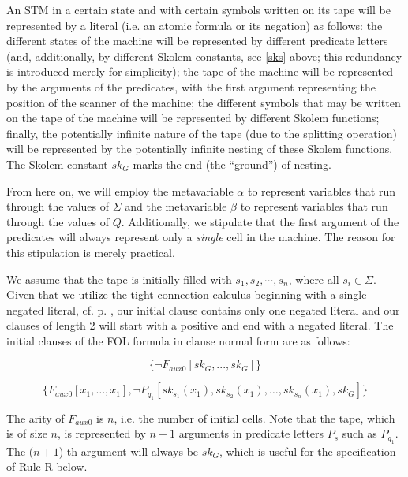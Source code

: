 \documentclass[%
  manuscript=article,   %
  year=2024,
  volume=77,
  doi=00000.000,
]{zfn}
\begin{document}
An STM in a certain state and with certain symbols written on its tape will be represented by a literal (i.e. an atomic formula or its negation) as follows: the different states of the machine will be represented by different predicate letters (and, additionally, by different Skolem constants, see \ref{sks} above; this redundancy is introduced merely for simplicity); the tape of the machine will be represented by the arguments of the predicates, with the first argument representing the position of the scanner of the machine; the different symbols that may be written on the tape of the machine will be represented by different Skolem functions; finally, the potentially infinite nature of the tape (due to the splitting operation) will be represented by the potentially infinite nesting of these Skolem functions. The Skolem constant $sk_G$ marks the end (the ``ground'') of nesting.

From here on, we will employ the metavariable $\alpha$ to represent variables that run through the values of $\Sigma$ and the metavariable $\beta$ to represent variables that run through the values of $Q$. Additionally, we stipulate that the first argument of the predicates will always represent only a \textit{single} cell in the machine. The reason for this stipulation is merely practical.

We assume that the tape is initially filled with $s_1, s_2,\cdots, s_n$, where all $s_i\in\Sigma$. 
Given that we utilize the tight connection calculus beginning with a single negated literal, cf. p. \pageref{onenegative}, our initial clause contains only one negated literal and our clauses of length 2 will start with a positive and end with a negated literal.
The initial clauses of the FOL formula in clause normal form are as follows:

\begin{equation}
\{\neg F_{aux0}[sk_G, ..., sk_G]\} \label{ini1}
\end{equation}

\begin{equation}
\{F_{aux0}[x_1, \ldots, x_1], \neg P_{q_1}[sk_{s_1}(x_1), sk_{s_2}(x_1), \ldots, sk_{s_n}(x_1), sk_G]\} \label{ini2}
\end{equation}

The arity of $F_{aux0}$ is $n$, i.e. the number of initial cells.
Note that the tape, which is of size $n$, is represented by $n+1$ arguments in predicate letters $P_s$ such as $P_{q_1}$.
The ($n+1$)-th argument will always be $sk_G$, which is useful for the specification of Rule R below.
\end{document}
